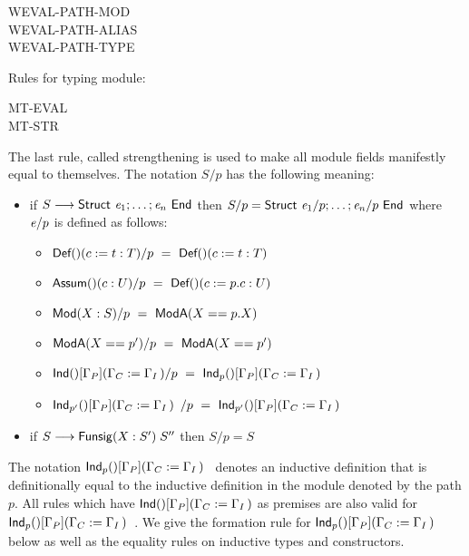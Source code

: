 \begin{description}
\item[WEVAL-PATH-MOD]
\item[WEVAL-PATH-ALIAS]
\item[WEVAL-PATH-TYPE]
\end{description}
 Rules for typing module:
\begin{description}
\item[MT-EVAL]
\item[MT-STR]
\end{description}
The last rule, called strengthening is used to make all module fields
manifestly equal to themselves. The notation $S/p$ has the following
meaning:
\begin{itemize}
\item if $S\longrightarrow{\sf Struct}~{\it e}_1;\dots;{\it e}_n~{\sf End}$ then
  $S/p={\sf Struct}~{\it e}_1/p;\dots;{\it e}_n/p~{\sf End}$ where ${\it e}/p$ is defined as
  follows:
  \begin{itemize}
  \item $\mbox{{\sf Def}$()(c:=t:T)$}/p ~=~ \mbox{{\sf Def}$()(c:=t:T)$}$
  \item $\mbox{{\sf Assum}$()(c:U)$}/p ~=~ \mbox{{\sf Def}$()(c:=p.c:U)$}$
  \item ${\sf Mod}({X}:{S})/p ~=~ {\sf ModA}({X}=={p.X})$
  \item ${\sf ModA}({X}=={p'})/p ~=~ {\sf ModA}({X}=={p'})$
  \item $\Ind{}{\Gamma_P}{\Gamma_C}{\Gamma_I}/p ~=~ \Indp{}{\Gamma_P}{\Gamma_C}{\Gamma_I}{p}$
  \item $\Indp{}{\Gamma_P}{\Gamma_C}{\Gamma_I}{p'}/p ~=~ \Indp{}{\Gamma_P}{\Gamma_C}{\Gamma_I}{p'}$
  \end{itemize}
\item if $S\longrightarrow{\sf Funsig}(X:S')\;S''$ then $S/p=S$
\end{itemize}
The notation $\Indp{}{\Gamma_P}{\Gamma_C}{\Gamma_I}{p}$ denotes an
inductive definition that is definitionally equal to the inductive
definition in the module denoted by the path $p$. All rules which have
$\Ind{}{\Gamma_P}{\Gamma_C}{\Gamma_I}$ as premises are also valid for 
$\Indp{}{\Gamma_P}{\Gamma_C}{\Gamma_I}{p}$. We give the formation rule
for $\Indp{}{\Gamma_P}{\Gamma_C}{\Gamma_I}{p}$ below as well as
the equality rules on inductive types and constructors. \\


